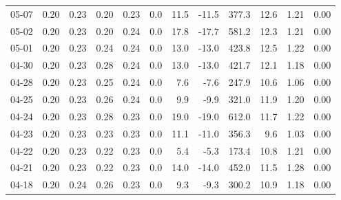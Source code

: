 \begin{threeparttable}
{\begin{tabular}{lrrrrrrrrrrr}
  05-07 &          0.20 &          0.23 &          0.20 &        0.23 &                 0.0 &                11.5 &      -11.5 &               377.3 &             12.6 &            1.21 &                   0.00 \\
  05-02 &          0.20 &          0.23 &          0.20 &        0.24 &                 0.0 &                17.8 &      -17.7 &               581.2 &             12.3 &            1.21 &                   0.00 \\
  05-01 &          0.20 &          0.23 &          0.24 &        0.24 &                 0.0 &                13.0 &      -13.0 &               423.8 &             12.5 &            1.22 &                   0.00 \\
  04-30 &          0.20 &          0.23 &          0.28 &        0.24 &                 0.0 &                13.0 &      -13.0 &               421.7 &             12.1 &            1.18 &                   0.00 \\
  04-28 &          0.20 &          0.23 &          0.25 &        0.24 &                 0.0 &                 7.6 &       -7.6 &               247.9 &             10.6 &            1.06 &                   0.00 \\
  04-25 &          0.20 &          0.23 &          0.26 &        0.24 &                 0.0 &                 9.9 &       -9.9 &               321.0 &             11.9 &            1.20 &                   0.00 \\
  04-24 &          0.20 &          0.23 &          0.28 &        0.23 &                 0.0 &                19.0 &      -19.0 &               612.0 &             11.7 &            1.22 &                   0.00 \\
  04-23 &          0.20 &          0.23 &          0.23 &        0.23 &                 0.0 &                11.1 &      -11.0 &               356.3 &              9.6 &            1.03 &                   0.00 \\
  04-22 &          0.20 &          0.23 &          0.22 &        0.23 &                 0.0 &                 5.4 &       -5.3 &               173.4 &             10.8 &            1.21 &                   0.00 \\
  04-21 &          0.20 &          0.23 &          0.22 &        0.23 &                 0.0 &                14.0 &      -14.0 &               452.0 &             11.5 &            1.28 &                   0.00 \\
  04-18 &          0.20 &          0.24 &          0.26 &        0.23 &                 0.0 &                 9.3 &       -9.3 &               300.2 &             10.9 &            1.18 &                   0.00 \\

\end{tabular}}
\end{threeparttable}
